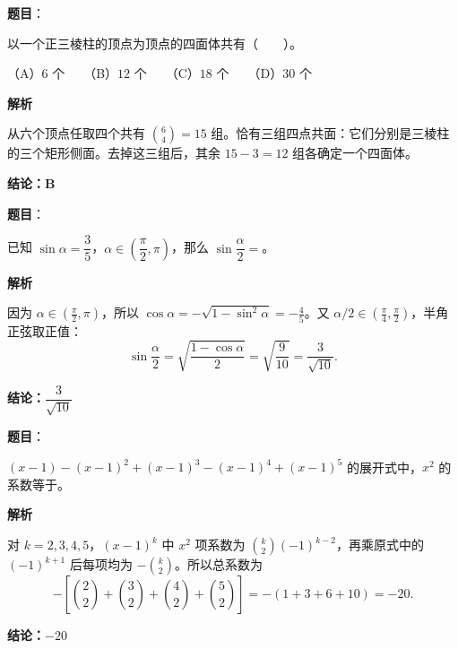 \begin{answer}

\textbf{题目}：

以一个正三棱柱的顶点为顶点的四面体共有\mbox{（　　）}。

（A）$6$ 个　　（B）$12$ 个　　（C）$18$ 个　　（D）$30$ 个

\textbf{解析}

从六个顶点任取四个共有 $\binom64=15$ 组。恰有三组四点共面：它们分别是三棱柱的三个矩形侧面。去掉这三组后，其余 $15-3=12$ 组各确定一个四面体。

\textbf{结论：B}


\end{answer}
\begin{answer}

\textbf{题目}：

已知 $\sin\alpha=\dfrac35$，$\alpha\in\left(\dfrac\pi2,\pi\right)$，那么 $\sin\dfrac\alpha2=$\gkblank{}。

\textbf{解析}

因为 $\alpha\in(\frac\pi2,\pi)$，所以 $\cos\alpha=-\sqrt{1-\sin^2\alpha}=-\frac45$。又 $\alpha/2\in(\frac\pi4,\frac\pi2)$，半角正弦取正值：
\nopagebreak[4]
\[
\sin\frac\alpha2=\sqrt{\frac{1-\cos\alpha}{2}}=\sqrt{\frac9{10}}=\frac3{\sqrt{10}}.
\]

\textbf{结论：$\dfrac{3}{\sqrt{10}}$}


\end{answer}
\begin{answer}

\textbf{题目}：

$(x-1)-(x-1)^2+(x-1)^3-(x-1)^4+(x-1)^5$ 的展开式中，$x^2$ 的系数等于\gkblank{}。

\textbf{解析}

对 $k=2,3,4,5$，$(x-1)^k$ 中 $x^2$ 项系数为 $\binom{k}{2}(-1)^{k-2}$，再乘原式中的 $(-1)^{k+1}$ 后每项均为 $-\binom{k}{2}$。所以总系数为
\nopagebreak[4]
\[
-\left[\binom22+\binom32+\binom42+\binom52\right]=-(1+3+6+10)=-20.
\]

\textbf{结论：$-20$}


\end{answer}
